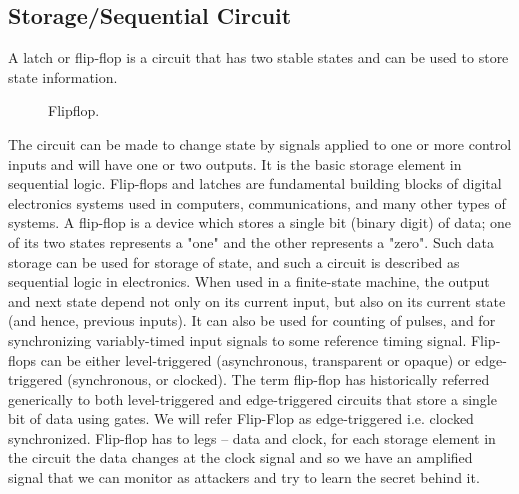 \subsection{ Storage/Sequential Circuit }
A latch or flip-flop is a circuit that has two stable states and can be used to store state information. 
\begin{figure}
    \centering
    
    \caption{Flipflop.} \label{fig:flipflop}
\end{figure}
The circuit can be made to change state by signals applied to one or more control inputs and will have one or two outputs. It is the basic storage element in sequential logic. Flip-flops and latches are fundamental building blocks of digital electronics systems used in computers, communications, and many other types of systems.
A flip-flop is a device which stores a single bit (binary digit) of data; one of its two states represents a "one" and the other represents a "zero". Such data storage can be used for storage of state, and such a circuit is described as sequential logic in electronics. When used in a finite-state machine, the output and next state depend not only on its current input, but also on its current state (and hence, previous inputs). It can also be used for counting of pulses, and for synchronizing variably-timed input signals to some reference timing signal.
Flip-flops can be either level-triggered (asynchronous, transparent or opaque) or edge-triggered (synchronous, or clocked). The term flip-flop has historically referred generically to both level-triggered and edge-triggered circuits that store a single bit of data using gates. We will refer Flip-Flop as edge-triggered i.e. clocked synchronized.
Flip-flop has to legs – data and clock, for each storage element in the circuit the data changes at the clock signal and so we have an amplified signal that we can monitor as attackers and try to learn the secret behind it.
